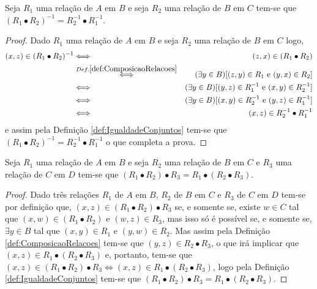 \begin{theorem}
	Seja $R_1$ uma relação de $A$ em $B$ e seja $R_2$ uma relação de $B$ em $C$ tem-se que $(R_1 \bullet R_2)^{-1} = R_2^{-1} \bullet R_1^{-1}$.
\end{theorem}

\begin{proof}
	Dado $R_1$ uma relação de $A$ em $B$ e seja $R_2$ uma relação de $B$ em $C$ logo, 
	\begin{eqnarray*}
		(x, z) \in (R_1 \bullet R_2)^{-1} & \Longleftrightarrow & (z, x) \in (R_1 \bullet R_2)\\
		& \stackrel{Def. \ref{def:ComposicaoRelacoes}}{\Longleftrightarrow }& (\exists y \in B)[(z, y) \in R_1 \text{ e } (y, x) \in R_2]\\
		& \Longleftrightarrow & (\exists y \in B)[(y, z) \in R_1^{-1} \text{ e } (x, y) \in R_2^{-1}]\\
		& \Longleftrightarrow & (\exists y \in B)[(x, y) \in R_2^{-1} \text{ e }(y, z) \in R_1^{-1} ]\\
		& \Longleftrightarrow & (x, z) \in R_2^{-1} \bullet R_1^{-1}
	\end{eqnarray*} 
	e assim pela Definição \ref{def:IgualdadeConjuntos} tem-se que $(R_1 \bullet R_2)^{-1} = R_2^{-1} \bullet R_1^{-1}$ o que completa a prova.
\end{proof}

\begin{theorem}
	Seja $R_1$ uma relação de $A$ em $B$ e seja $R_2$ uma relação de $B$ em $C$ e $R_3$ uma relação de $C$ em $D$ tem-se que $(R_1 \bullet R_2) \bullet R_3 = R_1 \bullet (R_2 \bullet R_3)$.
\end{theorem}

\begin{proof}
	Dado três relações $R_1$ de $A$ em $B$, $R_2$ de $B$ em $C$ e $R_3$ de $C$ em $D$ tem-se por definição que, $(x, z) \in (R_1 \bullet R_2) \bullet R_3$ se, e somente se, existe $w \in C$ tal que $(x, w) \in (R_1 \bullet R_2)$ e $(w, z) \in R_3$, mas isso só é possível se, e somente se, $\exists y \in B$ tal que $(x, y) \in R_1$ e $(y, w) \in R_2$. Mas assim pela Definição \ref{def:ComposicaoRelacoes} tem-se que $(y, z) \in R_2 \bullet R_3$, o que irá implicar que $(x, z) \in R_1 \bullet (R_2 \bullet R_3)$ e, portanto, tem-se que $(x, z) \in (R_1 \bullet R_2) \bullet R_3 \Longleftrightarrow (x, z) \in R_1 \bullet (R_2 \bullet R_3)$, logo pela Definição \ref{def:IgualdadeConjuntos} tem-se que $(R_1 \bullet R_2) \bullet R_3 = R_1 \bullet (R_2 \bullet R_3)$.
\end{proof}

